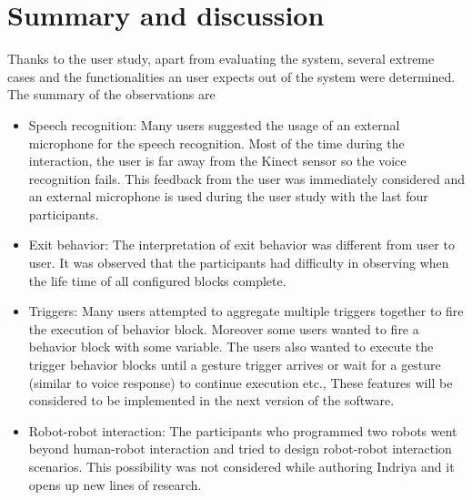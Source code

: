 \section{Summary and discussion}
Thanks to the user study, apart from evaluating the system, several extreme cases and the functionalities an user expects out of the system were determined. The summary of the observations are
\begin{itemize}
\item Speech recognition: Many users suggested the usage of an external microphone for the speech recognition. Most of the time during the interaction, the user is far away from the Kinect sensor so the voice recognition fails. This feedback from the user was immediately considered and an external microphone is used during the user study with the last four participants. 
\item Exit behavior: The interpretation of exit behavior was different from user to user. It was observed that the participants had difficulty in observing when the life time of all configured blocks complete.
\item Triggers: Many users attempted to aggregate multiple triggers together to fire the execution of behavior block. Moreover some users wanted to fire a behavior block with some variable. The users also wanted to execute the trigger behavior blocks until a gesture trigger arrives or wait for a gesture (similar to voice response) to continue execution etc., These features will be considered to be implemented in the next version of the software.
\item Robot-robot interaction: The participants who programmed two robots went beyond human-robot interaction and tried to design robot-robot interaction scenarios. This possibility was not considered while authoring Indriya and it opens up new lines of research.
\end{itemize}